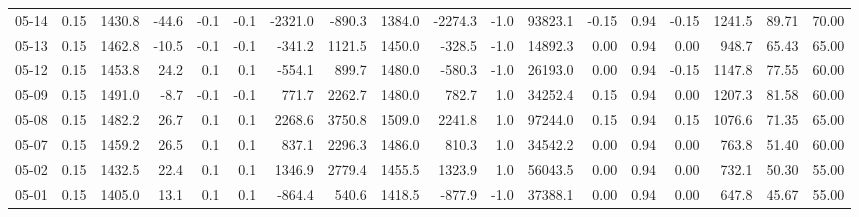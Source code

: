 \begin{threeparttable}
{\begin{tabular}{lrrrrrrrrrrrrrrrrr}
  05-14 &     0.15 & 1430.8 &             -44.6 &              -0.1 &               -0.1 &            -2321.0 &  -890.3 & 1384.0 &    -2274.3 &                     -1.0 &             93823.1 &      -0.15 &      0.94 &          -0.15 &           1241.5 &           89.71 &                  70.00 \\
  05-13 &     0.15 & 1462.8 &             -10.5 &              -0.1 &               -0.1 &             -341.2 &  1121.5 & 1450.0 &     -328.5 &                     -1.0 &             14892.3 &       0.00 &      0.94 &           0.00 &            948.7 &           65.43 &                  65.00 \\
  05-12 &     0.15 & 1453.8 &              24.2 &               0.1 &                0.1 &             -554.1 &   899.7 & 1480.0 &     -580.3 &                     -1.0 &             26193.0 &       0.00 &      0.94 &          -0.15 &           1147.8 &           77.55 &                  60.00 \\
  05-09 &     0.15 & 1491.0 &              -8.7 &              -0.1 &               -0.1 &              771.7 &  2262.7 & 1480.0 &      782.7 &                      1.0 &             34252.4 &       0.15 &      0.94 &           0.00 &           1207.3 &           81.58 &                  60.00 \\
  05-08 &     0.15 & 1482.2 &              26.7 &               0.1 &                0.1 &             2268.6 &  3750.8 & 1509.0 &     2241.8 &                      1.0 &             97244.0 &       0.15 &      0.94 &           0.15 &           1076.6 &           71.35 &                  65.00 \\
  05-07 &     0.15 & 1459.2 &              26.5 &               0.1 &                0.1 &              837.1 &  2296.3 & 1486.0 &      810.3 &                      1.0 &             34542.2 &       0.00 &      0.94 &           0.00 &            763.8 &           51.40 &                  60.00 \\
  05-02 &     0.15 & 1432.5 &              22.4 &               0.1 &                0.1 &             1346.9 &  2779.4 & 1455.5 &     1323.9 &                      1.0 &             56043.5 &       0.00 &      0.94 &           0.00 &            732.1 &           50.30 &                  55.00 \\
  05-01 &     0.15 & 1405.0 &              13.1 &               0.1 &                0.1 &             -864.4 &   540.6 & 1418.5 &     -877.9 &                     -1.0 &             37388.1 &       0.00 &      0.94 &           0.00 &            647.8 &           45.67 &                  55.00 \\

\end{tabular}}
\end{threeparttable}
